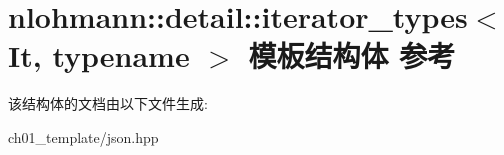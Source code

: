 \hypertarget{structnlohmann_1_1detail_1_1iterator__types}{}\section{nlohmann\+::detail\+::iterator\+\_\+types$<$ It, typename $>$ 模板结构体 参考}
\label{structnlohmann_1_1detail_1_1iterator__types}


该结构体的文档由以下文件生成\+:\begin{DoxyCompactItemize}
\item 
ch01\+\_\+template/json.\+hpp\end{DoxyCompactItemize}
